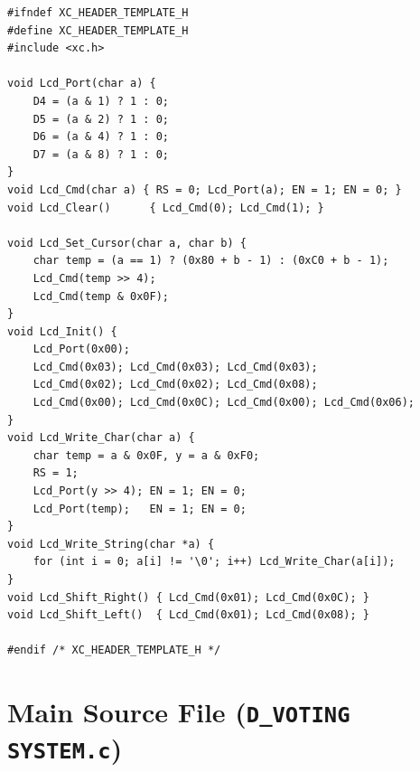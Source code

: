\documentclass[11pt, a4paper]{report}
\begin{document}
\begin{lstlisting}[caption={lcd.h --- 4-bit LCD driver for PIC16F877A},
                   label={lst:lcdh}]
#ifndef XC_HEADER_TEMPLATE_H
#define XC_HEADER_TEMPLATE_H
#include <xc.h>

void Lcd_Port(char a) {
    D4 = (a & 1) ? 1 : 0;
    D5 = (a & 2) ? 1 : 0;
    D6 = (a & 4) ? 1 : 0;
    D7 = (a & 8) ? 1 : 0;
}
void Lcd_Cmd(char a) { RS = 0; Lcd_Port(a); EN = 1; EN = 0; }
void Lcd_Clear()      { Lcd_Cmd(0); Lcd_Cmd(1); }

void Lcd_Set_Cursor(char a, char b) {
    char temp = (a == 1) ? (0x80 + b - 1) : (0xC0 + b - 1);
    Lcd_Cmd(temp >> 4);
    Lcd_Cmd(temp & 0x0F);
}
void Lcd_Init() {
    Lcd_Port(0x00);
    Lcd_Cmd(0x03); Lcd_Cmd(0x03); Lcd_Cmd(0x03);
    Lcd_Cmd(0x02); Lcd_Cmd(0x02); Lcd_Cmd(0x08);
    Lcd_Cmd(0x00); Lcd_Cmd(0x0C); Lcd_Cmd(0x00); Lcd_Cmd(0x06);
}
void Lcd_Write_Char(char a) {
    char temp = a & 0x0F, y = a & 0xF0;
    RS = 1;
    Lcd_Port(y >> 4); EN = 1; EN = 0;
    Lcd_Port(temp);   EN = 1; EN = 0;
}
void Lcd_Write_String(char *a) {
    for (int i = 0; a[i] != '\0'; i++) Lcd_Write_Char(a[i]);
}
void Lcd_Shift_Right() { Lcd_Cmd(0x01); Lcd_Cmd(0x0C); }
void Lcd_Shift_Left()  { Lcd_Cmd(0x01); Lcd_Cmd(0x08); }

#endif /* XC_HEADER_TEMPLATE_H */
\end{lstlisting}

\chapter{Main Source File (\texttt{D\_VOTING SYSTEM.c})}
\label{app:main}
\end{document}
